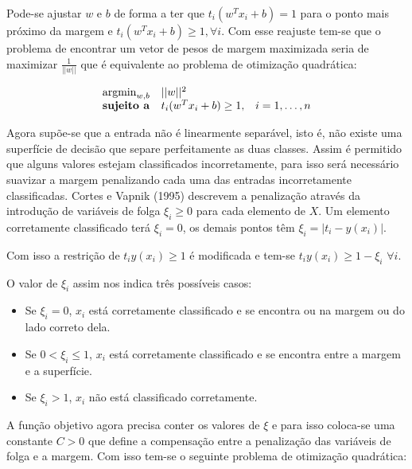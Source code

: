 Pode-se ajustar $w$ e $b$ de forma a ter que $t_i(w^Tx_i + b) = 1$ para o ponto mais
próximo da margem e $t_i(w^Tx_i + b) \ge 1, \forall i$. Com esse reajuste tem-se que o
problema de encontrar um vetor de pesos de margem maximizada seria de maximizar 
$\frac{1}{||w||}$ que é equivalente ao problema de otimização quadrática:

\begin{center}
	\begin{equation}
		\begin{array}{ll@{}ll}
				\argmin_{w, b} & ||w||^2 &\\
				\textbf{sujeito a}& t_i(w^Tx_i + b) \ge 1, &&i = 1, \ldots ,n 
		\end{array}
	\end{equation}
\end{center}

Agora supõe-se que a entrada não é linearmente separável, 
isto é, não existe uma superfície de decisão que separe perfeitamente as duas classes. Assim
é permitido que alguns valores estejam classificados incorretamente, para isso
será necessário suavizar a margem penalizando cada uma das entradas incorretamente
classificadas. Cortes e Vapnik (1995)\cite{cortesVapnik1995} descrevem a penalização
através da introdução de variáveis de folga $\xi_i \ge 0$ para cada elemento de $X$.
Um elemento corretamente classificado terá $\xi_i = 0$, os demais pontos têm
 $\xi_i = |t_i - y(x_i)|$.
 
Com isso a restrição de $t_iy(x_i) \ge 1$ é modificada e tem-se 
$t_iy(x_i) \ge 1 - \xi_i$  $\forall i$.

O valor de $\xi_i$ assim nos indica três possíveis casos:

\begin{itemize}
	\item Se $\xi_i = 0$, $x_i$ está corretamente classificado e se encontra
	ou na margem ou do lado correto dela.
	\item Se $0 < \xi_i \le 1$, $x_i$ está corretamente classificado e se encontra
	entre a margem e a superfície.
	\item Se $\xi_i > 1$, $x_i$ não está classificado corretamente.
\end{itemize}

A função objetivo agora precisa conter os valores de $\xi$ e para isso coloca-se
uma constante $C > 0$ que define a compensação entre a penalização das variáveis de
folga e a margem. Com isso tem-se o seguinte problema de otimização quadrática:

